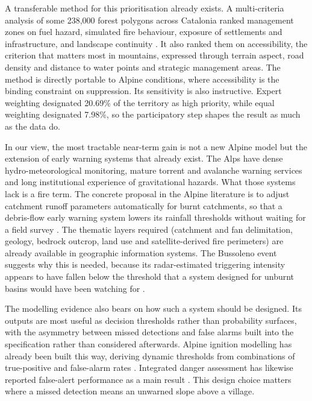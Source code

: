 \documentclass[11pt,a4paper]{article}
\begin{document}
A transferable method for this prioritisation already exists. A multi-criteria analysis of some 238{,}000 forest polygons across Catalonia ranked management zones on fuel hazard, simulated fire behaviour, exposure of settlements and infrastructure, and landscape continuity \citep{krsnik_spatial_2024}. It also ranked them on accessibility, the criterion that matters most in mountains, expressed through terrain aspect, road density and distance to water points and strategic management areas. The method is directly portable to Alpine conditions, where accessibility is the binding constraint on suppression. Its sensitivity is also instructive. Expert weighting designated 20.69\% of the territory as high priority, while equal weighting designated 7.98\%, so the participatory step shapes the result as much as the data do.

In our view, the most tractable near-term gain is not a new Alpine model but the extension of early warning systems that already exist. The Alps have dense hydro-meteorological monitoring, mature torrent and avalanche warning services and long institutional experience of gravitational hazards. What those systems lack is a fire term. The concrete proposal in the Alpine literature is to adjust catchment runoff parameters automatically for burnt catchments, so that a debris-flow early warning system lowers its rainfall thresholds without waiting for a field survey \citep{tiranti_wildfires_2021}. The thematic layers required (catchment and fan delimitation, geology, bedrock outcrop, land use and satellite-derived fire perimeters) are already available in geographic information systems. The Bussoleno event suggests why this is needed, because its radar-estimated triggering intensity appears to have fallen below the threshold that a system designed for unburnt basins would have been watching for \citep{laporta_postwildfire_2025}.

The modelling evidence also bears on how such a system should be designed. Its outputs are most useful as decision thresholds rather than probability surfaces, with the asymmetry between missed detections and false alarms built into the specification rather than considered afterwards. Alpine ignition modelling has already been built this way, deriving dynamic thresholds from combinations of true-positive and false-alarm rates \citep{moreno_spacetime_2025}. Integrated danger assessment has likewise reported false-alert performance as a main result \citep{muller_towards_2020}. This design choice matters where a missed detection means an unwarned slope above a village.
\end{document}

